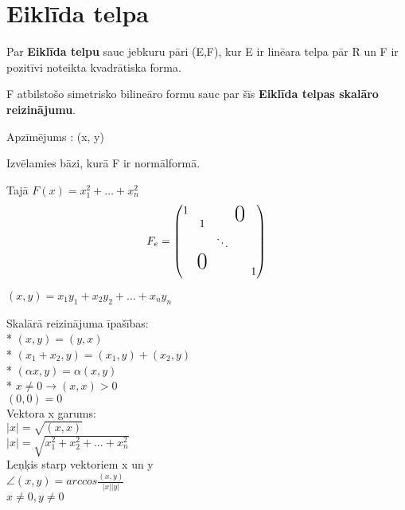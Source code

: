 \documentclass[12pt]{article}
\begin{document}
\section*{Eiklīda telpa}

\begin{definition}
Par \textbf{Eiklīda telpu} sauc jebkuru pāri (E,F), kur E ir linēara telpa pār R un F ir pozitīvi noteikta kvadrātiska forma.

F atbilstošo simetrisko bilineāro formu sauc par šīs \textbf{Eiklīda telpas skalāro reizinājumu}. 

\end{definition}

Apzīmējums : (x, y)

Izvēlamies bāzi, kurā F ir normālformā.

\newcommand\x{\times}
\newcommand\bigzero{\makebox(0,0){\text{\huge0}}}
\newcommand*{\bord}{\multicolumn{1}{c|}{}}

Tajā $F(x)= x_1^2+ \ldots + x_n^2 $
\begin{gather*}
	F_e = 
	\begin{pmatrix}
	1 & && \bigzero   \\ 
    	& 1 &  \\
	& &  \ddots  &\\ 
        & \bigzero  &  \\
    	& &  & &  1  \\ 	
    \end{pmatrix}
\end{gather*}

$(x,y) = x_1y_1 + x_2y_2 + \ldots + x_ny_n$

Skalārā reizinājuma īpašības: \\
* $(x,y) = (y,x)$ \\
* $(x_1+x_2, y) = (x_1,y) + (x_2,y)$ \\
* $(\alpha x,y)= \alpha(x,y)$ \\
* $ x \neq 0 \rightarrow (x,x) > 0$ \\
$(0,0) = 0$ \\

Vektora x garums: \\
$|x| = \sqrt{(x,x)}$ \\
$|x| = \sqrt{x_1^2 + x_2^2 + \ldots + x_n^2}$ \\

Leņķis starp vektoriem x un y \\
$\angle (x,y) = arccos \frac{(x,y)}{|x||y|}$ \\ 
$x \neq 0, y \neq 0$
\end{document}
